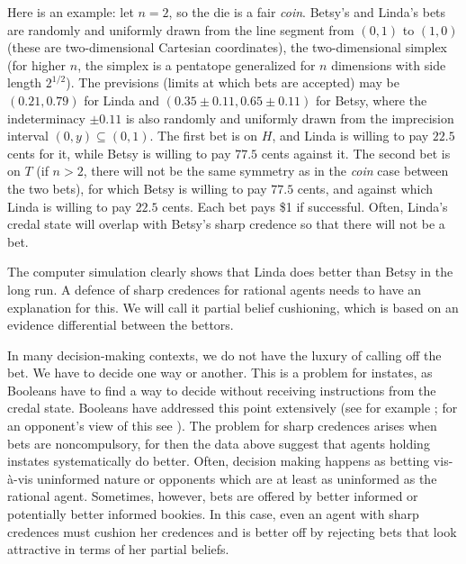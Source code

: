\documentclass[11pt]{article}
\begin{document}
Here is an example: let $n=2$, so the die is a fair \textit{coin}.
Betsy's and Linda's bets are randomly and uniformly drawn from the
line segment from $(0,1)$ to $(1,0)$ (these are two-dimensional
Cartesian coordinates), the two-dimensional simplex (for higher $n$,
the simplex is a pentatope generalized for $n$ dimensions with side
length $2^{1/2}$). The previsions (limits at which bets are accepted)
may be $(0.21,0.79)$ for Linda and $(0.35\pm{}0.11,0.65\pm{}0.11)$ for
Betsy, where the indeterminacy $\pm{}0.11$ is also randomly and
uniformly drawn from the imprecision interval $(0,y)\subseteq(0,1)$.
The first bet is on $H$, and Linda is willing to pay $22.5$ cents for
it, while Betsy is willing to pay $77.5$ cents against it. The second
bet is on $T$ (if $n>2$, there will not be the same symmetry as in the
\textit{coin} case between the two bets), for which Betsy is willing
to pay $77.5$ cents, and against which Linda is willing to pay $22.5$
cents. Each bet pays \$1 if successful. Often, Linda's credal state
will overlap with Betsy's sharp credence so that there will not be a
bet.

The computer simulation clearly shows that Linda does better than
Betsy in the long run. A defence of sharp credences for rational
agents needs to have an explanation for this. We will call it partial
belief cushioning, which is based on an evidence differential between
the bettors.

In many decision-making contexts, we do not have the luxury of calling
off the bet. We have to decide one way or another. This is a problem
for instates, as Booleans have to find a way to decide without
receiving instructions from the credal state. Booleans have addressed
this point extensively (see for example ; for
an opponent's view of this see ). The problem
for sharp credences arises when bets are noncompulsory, for then the
data above suggest that agents holding instates systematically do
better. Often, decision making happens as betting vis-{\`a}-vis
uninformed nature or opponents which are at least as uninformed as the
rational agent. Sometimes, however, bets are offered by better
informed or potentially better informed bookies. In this case, even an
agent with sharp credences must cushion her credences and is better
off by rejecting bets that look attractive in terms of her partial
beliefs.
\end{document}
